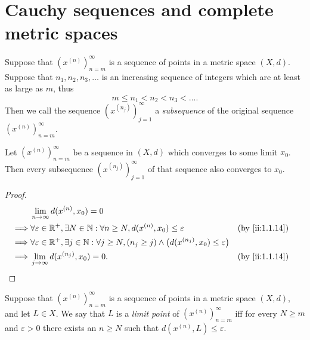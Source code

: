 \section{Cauchy sequences and complete metric spaces}\label{ii:sec:1.4}

\begin{defn}[Subsequences]\label{ii:1.4.1}
  Suppose that \((x^{(n)})_{n = m}^\infty\) is a sequence of points in a metric space \((X, d)\).
  Suppose that \(n_1, n_2, n_3, \dots\) is an increasing sequence of integers which are at least as large as \(m\), thus
  \[
    m \leq n_1 < n_2 < n_3 < \dots.
  \]
  Then we call the sequence \((x^{(n_j)})_{j = 1}^\infty\) a \emph{subsequence} of the original sequence \((x^{(n)})_{n = m}^\infty\).
\end{defn}

\setcounter{thm}{2}
\begin{lem}\label{ii:1.4.3}
  Let \((x^{(n)})_{n = m}^\infty\) be a sequence in \((X, d)\) which converges to some limit \(x_0\).
  Then every subsequence \((x^{(n_j)})_{j = 1}^\infty\) of that sequence also converges to \(x_0\).
\end{lem}

\begin{proof}
  \begin{align*}
             & \lim_{n \to \infty} d(x^{(n)}, x_0) = 0                                                                                                                \\
    \implies & \forall \varepsilon \in \R^+, \exists N \in \N : \forall n \geq N, d(x^{(n)}, x_0) \leq \varepsilon                                &  & \by{ii:1.1.14} \\
    \implies & \forall \varepsilon \in \R^+, \exists j \in \N : \forall j \geq N, (n_j \geq j) \land \big(d(x^{(n_j)}, x_0) \leq \varepsilon\big)                     \\
    \implies & \lim_{j \to \infty} d(x^{(n_j)}, x_0) = 0.                                                                                         &  & \by{ii:1.1.14}
  \end{align*}
\end{proof}

\begin{defn}\label{ii:1.4.4}
  Suppose that \((x^{(n)})_{n = m}^\infty\) is a sequence of points in a metric space \((X, d)\), and let \(L \in X\).
  We say that \(L\) is a \emph{limit point} of \((x^{(n)})_{n = m}^\infty\) iff for every \(N \geq m\) and \(\varepsilon > 0\) there exists an \(n \geq N\) such that \(d(x^{(n)}, L) \leq \varepsilon\).
\end{defn}

